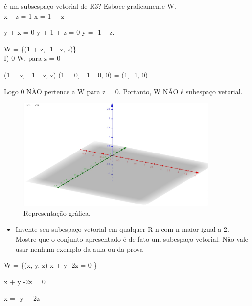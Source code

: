 \documentclass{article}
\begin{document}
    \item é um subsespaço vetorial de R3? Esboce graficamente W.\\

x – z = 1 \to x = 1 + z

y + x = 0 \to y + 1 + z = 0 \to y = -1 – z. 

W = \{(1 + z, -1 - z, z)\} \\

I) 0 \in W, para z = 0 

(1 + z, - 1 – z, z) \to (1 + 0, - 1 – 0, 0) = (1, -1, 0).  

Logo 0 NÃO pertence a W para z = 0. Portanto, W NÃO é subespaço vetorial.\\ 

\begin{figure}[!h]
\centering
\includegraphics[width=10cm]{graficoquestao3.jpg}
\caption{Representação gráfica.}
\label{fig:graficoquesto3.jpg}
\end{figure}


\begin{itemize}

\item Invente seu subespaço vetorial em qualquer R n com n maior igual a 2. Mostre que o conjunto apresentado é de fato
um subespaço vetorial. Não vale usar nenhum exemplo da aula ou da prova
\end{itemize}

W = \{(x, y, z) \mid  x + y -2z = 0 \} 

 

x + y -2z = 0

x = -y + 2z 
\end{document}

